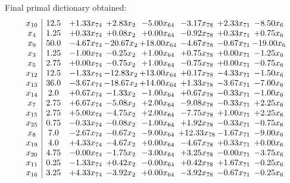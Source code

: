 \documentclass[8pt]{article}
\begin{document}
 Final primal dictionary obtained: 
\[\begin{array}{c| c c@{\hskip 2pt} c@{\hskip 2pt} c@{\hskip 2pt} c@{\hskip 2pt} c@{\hskip 2pt} c@{\hskip 2pt} }
 x_{10}   &  12.5 & +  1.33 x_{74} & +  2.83 x_{2} & -5.00 x_{64} & -3.17 x_{78} & +  2.33 x_{71} & -8.50 x_{6}\\
 x_{4}   &  1.25 & +  0.33 x_{74} & +  0.08 x_{2} & +  0.00 x_{64} & -0.92 x_{78} & +  0.33 x_{71} & +  0.75 x_{6}\\
 x_{9}   &  50.0 & -4.67 x_{74} & -20.67 x_{2} & + 18.00 x_{64} & -4.67 x_{78} & -0.67 x_{71} & -19.00 x_{6}\\
 x_{3}   &  1.25 & -1.00 x_{74} & -0.25 x_{2} & +  1.00 x_{64} & +  0.75 x_{78} & +  0.00 x_{71} & -1.25 x_{6}\\
 x_{5}   &  2.75 & +  0.00 x_{74} & -0.75 x_{2} & +  1.00 x_{64} & -0.75 x_{78} & +  0.00 x_{71} & -0.75 x_{6}\\
 x_{12}   &  12.5 & -1.33 x_{74} & -12.83 x_{2} & + 13.00 x_{64} & +  0.17 x_{78} & -4.33 x_{71} & -1.50 x_{6}\\
 x_{13}   &  36.0 & -3.67 x_{74} & -18.67 x_{2} & + 14.00 x_{64} & +  1.33 x_{78} & -3.67 x_{71} & -7.00 x_{6}\\
 x_{14}   &  2.0 & +  0.67 x_{74} & -1.33 x_{2} & -1.00 x_{64} & +  0.67 x_{78} & -0.33 x_{71} & -1.00 x_{6}\\
 x_{7}   &  2.75 & +  6.67 x_{74} & -5.08 x_{2} & +  2.00 x_{64} & -9.08 x_{78} & -0.33 x_{71} & +  2.25 x_{6}\\
 x_{15}   &  2.75 & +  5.00 x_{74} & -4.75 x_{2} & +  2.00 x_{64} & -7.75 x_{78} & +  1.00 x_{71} & +  2.25 x_{6}\\
 x_{25}   &  0.75 & -0.33 x_{74} & -0.08 x_{2} & -1.00 x_{64} & +  1.92 x_{78} & -0.33 x_{71} & -0.75 x_{6}\\
 x_{8}   &  7.0 & -2.67 x_{74} & -0.67 x_{2} & -9.00 x_{64} & + 12.33 x_{78} & -1.67 x_{71} & -9.00 x_{6}\\
 x_{19}   &  4.0 & +  4.33 x_{74} & -4.67 x_{2} & +  0.00 x_{64} & -4.67 x_{78} & +  0.33 x_{71} & +  0.00 x_{6}\\
 x_{20}   &  4.75 & -0.00 x_{74} & -1.75 x_{2} & -3.00 x_{64} & +  3.25 x_{78} & -0.00 x_{71} & -3.75 x_{6}\\
 x_{11}   &  0.25 & -1.33 x_{74} & +  0.42 x_{2} & -0.00 x_{64} & +  0.42 x_{78} & +  1.67 x_{71} & -0.25 x_{6}\\
 x_{16}   &  3.25 & +  4.33 x_{74} & -3.92 x_{2} & +  0.00 x_{64} & -3.92 x_{78} & -0.67 x_{71} & -0.25 x_{6}\\

\end{array}\]
\end{document}
